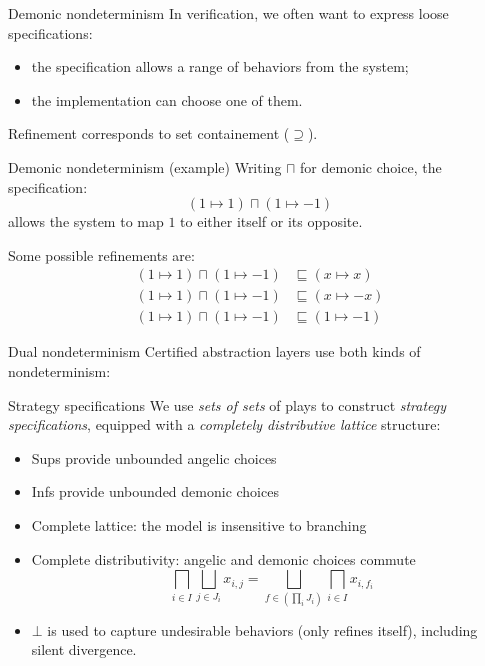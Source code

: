 \documentclass[aspectratio=54]{beamer}
\begin{document}
\begin{frame}{Demonic nondeterminism} %
  In verification,
  we often want to express loose specifications:
  \begin{itemize}
    \item the specification allows a range of behaviors
      from the system;
    \item the implementation can choose one of them.
  \end{itemize}
  Refinement corresponds to set containement ($\supseteq$).
\end{frame}

\begin{frame}{Demonic nondeterminism (example)} %
  Writing $\sqcap$ for demonic choice,
  the specification:
  \[
    (1 \mapsto 1) \sqcap (1 \mapsto -1)
  \]
  allows the system to map $1$ to either itself or its opposite.

  Some possible refinements are:
  \begin{align*}
    (1 \mapsto 1) \sqcap (1 \mapsto -1) &\sqsubseteq
      (x \mapsto x) \\
    (1 \mapsto 1) \sqcap (1 \mapsto -1) &\sqsubseteq
      (x \mapsto -x) \\
    (1 \mapsto 1) \sqcap (1 \mapsto -1) &\sqsubseteq
      (1 \mapsto -1)
  \end{align*}
\end{frame}

\begin{frame}{Dual nondeterminism} %
  Certified abstraction layers use
  both kinds of nondeterminism:
  \[
  \]
\end{frame}

\begin{frame}{Strategy specifications} %
We use \emph{sets of sets} of plays
to construct \emph{strategy specifications},
equipped with a
\emph{completely distributive lattice}
structure:
\begin{itemize}
  \item Sups provide unbounded angelic choices
  \item Infs provide unbounded demonic choices
  \item Complete lattice: the model is insensitive to branching
  \item Complete distributivity: angelic and demonic choices commute
  \[
      \bigsqcap_{i \in I} \bigsqcup_{j \in J_i} x_{i,j} =
      \bigsqcup_{f \in (\prod_i J_i)} \bigsqcap_{i \in I} x_{i, f_i}
  \]
  \item $\bot$ is used to capture undesirable behaviors (only refines itself),
    including silent divergence.
\end{itemize}
\end{frame}
\end{document}
